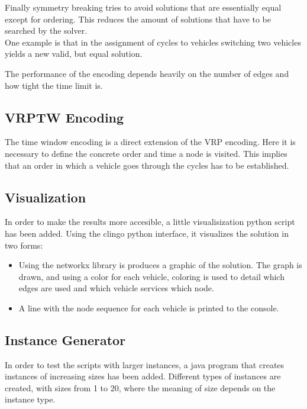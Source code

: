 \documentclass[12pt, letterpaper]{article}
\begin{document}
Finally symmetry breaking tries to avoid solutions that are essentially equal except for ordering. This reduces the amount of solutions that have to be searched by the solver.\\
One example is that in the assignment of cycles to vehicles switching two vehicles yields a new valid, but equal solution.

The performance of the encoding depends heavily on the number of edges and how tight the time limit is.

\subsection{VRPTW Encoding}
The time window encoding is a direct extension of the VRP encoding. Here it is necessary to define the concrete order and time a node is visited. This implies that an order in which a vehicle goes through the cycles has to be established.\\


\subsection{Visualization}
In order to make the results more accesible, a little visualisization python script has been added. Using the clingo python interface, it visualizes the solution in two forms:
\begin{itemize}
	\item Using the networkx library is produces a graphic of the solution. The graph is drawn, and using a color for each vehicle, coloring is used to detail which edges are used and which vehicle services which node.
	\item A line with the node sequence for each vehicle is printed to the console.
\end{itemize}


\subsection{Instance Generator}
In order to test the scripts with larger instances, a java program that creates instances of increasing sizes has been added. Different types of instances are created, with sizes from 1 to 20, where the meaning of size depends on the instance type.
\end{document}
